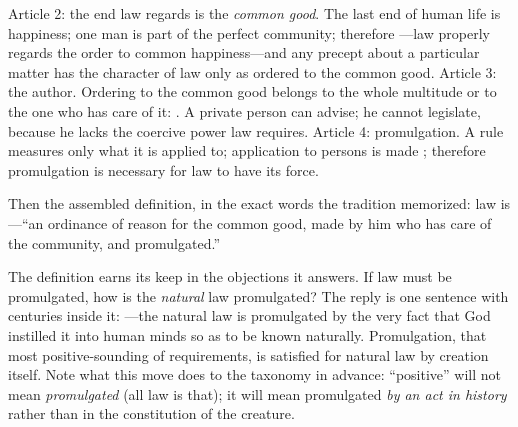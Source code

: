 Article 2: the end law regards is the \emph{common good}. The last end of human life is happiness; one man is part of the perfect community; therefore ---law properly regards the order to common happiness---and any precept about a particular matter has the character of law only as ordered to the common good. Article 3: the author. Ordering to the common good belongs to the whole multitude or to the one who has care of it: . A private person can advise; he cannot legislate, because he lacks the coercive power law requires. Article 4: promulgation. A rule measures only what it is applied to; application to persons is made ; therefore promulgation is necessary for law to have its force.

Then the assembled definition, in the exact words the tradition memorized: law is ---``an ordinance of reason for the common good, made by him who has care of the community, and promulgated.''

The definition earns its keep in the objections it answers. If law must be promulgated, how is the \emph{natural} law promulgated? The reply is one sentence with centuries inside it: ---the natural law is promulgated by the very fact that God instilled it into human minds so as to be known naturally. Promulgation, that most positive-sounding of requirements, is satisfied for natural law by creation itself. Note what this move does to the taxonomy in advance: ``positive'' will not mean \emph{promulgated} (all law is that); it will mean promulgated \emph{by an act in history} rather than in the constitution of the creature.

